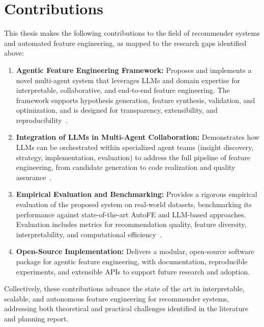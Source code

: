 
\section{Contributions}
This thesis makes the following contributions to the field of recommender systems and automated feature engineering, as mapped to the research gaps identified above:
\begin{enumerate}
    \item \textbf{Agentic Feature Engineering Framework:} Proposes and implements a novel multi-agent system that leverages LLMs and domain expertise for interpretable, collaborative, and end-to-end feature engineering. The framework supports hypothesis generation, feature synthesis, validation, and optimization, and is designed for transparency, extensibility, and reproducibility~\cite{Wang2024RecMind,Zou2025FEBP,Planning_Report}.
    \item \textbf{Integration of LLMs in Multi-Agent Collaboration:} Demonstrates how LLMs can be orchestrated within specialized agent teams (insight discovery, strategy, implementation, evaluation) to address the full pipeline of feature engineering, from candidate generation to code realization and quality assurance~\cite{litterature_review,MACRec}.
    \item \textbf{Empirical Evaluation and Benchmarking:} Provides a rigorous empirical evaluation of the proposed system on real-world datasets, benchmarking its performance against state-of-the-art AutoFE and LLM-based approaches. Evaluation includes metrics for recommendation quality, feature diversity, interpretability, and computational efficiency~\cite{litterature_review,Planning_Report}.
    \item \textbf{Open-Source Implementation:} Delivers a modular, open-source software package for agentic feature engineering, with documentation, reproducible experiments, and extensible APIs to support future research and adoption.
\end{enumerate}

Collectively, these contributions advance the state of the art in interpretable, scalable, and autonomous feature engineering for recommender systems, addressing both theoretical and practical challenges identified in the literature and planning report.

